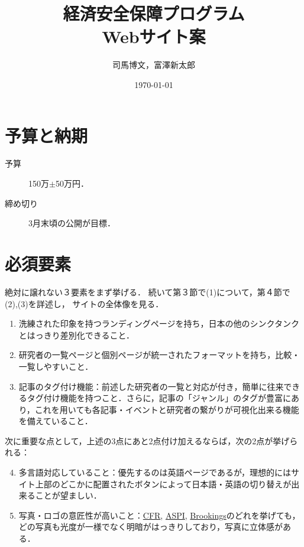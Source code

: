 \documentclass[uplatex,dvipdfmx]{jsarticle}
\title{経済安全保障プログラム\\Webサイト案}
\author{司馬博文，富澤新太郎}
\date{\today}
\begin{document}
\maketitle

\section{予算と納期}

\begin{description}
    \item[予算] 150万$\pm$50万円．
    \item[締め切り] 3月末頃の公開が目標．
\end{description}

\section{必須要素}

\begin{tcolorbox}[colframe=ForestGreen, colback=ForestGreen!10!white,breakable,colbacktitle=ForestGreen!40!white,coltitle=black,fonttitle=\bfseries\sffamily,
title=]
    絶対に譲れない３要素をまず挙げる．
    続いて第３節で(1)について，第４節で(2),(3)を詳述し，
    サイトの全体像を見る．
\end{tcolorbox}

\begin{enumerate}
    \item 洗練された印象を持つランディングページを持ち，日本の他のシンクタンクとはっきり差別化できること．
    \item 研究者の一覧ページと個別ページが統一されたフォーマットを持ち，比較・一覧しやすいこと．
    \item 記事のタグ付け機能：前述した研究者の一覧と対応が付き，簡単に往来できるタグ付け機能を持つこと．さらに，記事の「ジャンル」のタグが豊富にあり，これを用いても各記事・イベントと研究者の繋がりが可視化出来る機能を備えていること．
\end{enumerate}

次に重要な点として，上述の3点にあと2点付け加えるならば，次の2点が挙げられる：
\begin{enumerate}\setcounter{enumi}{3}
    \item 多言語対応していること：優先するのは英語ページであるが，理想的にはサイト上部のどこかに配置されたボタンによって日本語・英語の切り替えが出来ることが望ましい．
    \item 写真・ロゴの意匠性が高いこと：\href{https://www.cfr.org/}{CFR}, \href{https://www.aspi.org.au/}{ASPI}, \href{https://www.brookings.edu/}{Brookings}のどれを挙げても，どの写真も光度が一様でなく明暗がはっきりしており，写真に立体感がある．
\end{enumerate}
\end{document}
